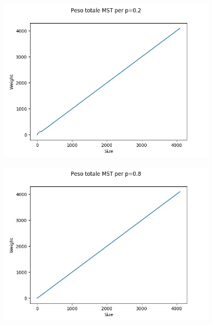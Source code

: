 \documentclass[]{article}
\begin{document}
\begin{figure}[H]
    \centering
    \begin{subfigure}[b]{0.45\linewidth} 
        \centering
        \includegraphics[width=\textwidth]{krusk_Weight_p=02}
        \label{fig:krusk_Weight_p=02}
    \end{subfigure}
    \quad
    \begin{subfigure}[b]{0.45\linewidth}
        \centering
        \includegraphics[width=\textwidth]{krusk_Weight_p=08}
        \label{fig:krusk_Weight_p=08}
    \end{subfigure}
\end{figure}
\end{document}
